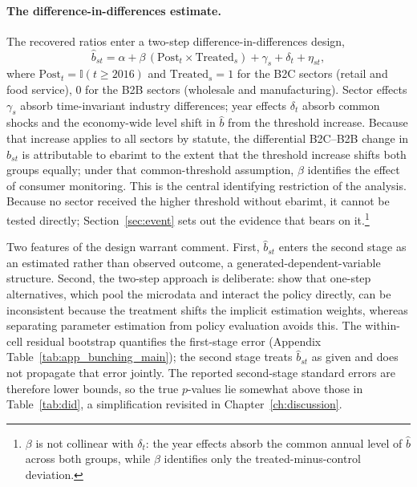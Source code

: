 \documentclass[12pt,oneside,a4paper]{report}
\begin{document}
\paragraph{The difference-in-differences estimate.}
The recovered ratios enter a two-step difference-in-differences design,
\begin{equation}
\hat{b}_{st} = \alpha + \beta\,(\mathrm{Post}_t \times \mathrm{Treated}_s)
             + \gamma_s + \delta_t + \eta_{st},
\label{eq:did}
\end{equation}
where $\mathrm{Post}_t = \mathbb{I}(t \geq 2016)$ and $\mathrm{Treated}_s = 1$ for the B2C sectors (retail and food service), $0$ for the B2B sectors (wholesale and manufacturing). Sector effects $\gamma_s$ absorb time-invariant industry differences; year effects $\delta_t$ absorb common shocks and the economy-wide level shift in $\hat{b}$ from the threshold increase. Because that increase applies to all sectors by statute, the differential B2C--B2B change in $\hat{b}_{st}$ is attributable to ebarimt to the extent that the threshold increase shifts both groups equally; under that common-threshold assumption, $\beta$ identifies the effect of consumer monitoring. This is the central identifying restriction of the analysis. Because no sector received the higher threshold without ebarimt, it cannot be tested directly; Section~\ref{sec:event} sets out the evidence that bears on it.\footnote{$\beta$ is not collinear with $\delta_t$: the year effects absorb the common annual level of $\hat{b}$ across both groups, while $\beta$ identifies only the treated-minus-control deviation.}

Two features of the design warrant comment. First, $\hat{b}_{st}$ enters the second stage as an estimated rather than observed outcome, a generated-dependent-variable structure. Second, the two-step approach is deliberate: \textcite{arkhangelsky2024causal} show that one-step alternatives, which pool the microdata and interact the policy directly, can be inconsistent because the treatment shifts the implicit estimation weights, whereas separating parameter estimation from policy evaluation avoids this. The within-cell residual bootstrap quantifies the first-stage error (Appendix Table~\ref{tab:app_bunching_main}); the second stage treats $\hat{b}_{st}$ as given and does not propagate that error jointly. The reported second-stage standard errors are therefore lower bounds, so the true $p$-values lie somewhat above those in Table~\ref{tab:did}, a simplification revisited in Chapter~\ref{ch:discussion}.
\end{document}
